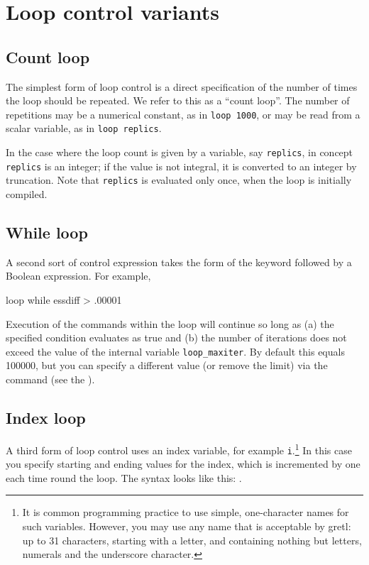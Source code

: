 \section{Loop control variants}
\label{loop-control}

\subsection{Count loop}
\label{loop-count}

The simplest form of loop control is a direct specification of the
number of times the loop should be repeated.  We refer to this as a
``count loop''.  The number of repetitions may be a numerical
constant, as in \verb+loop 1000+, or may be read from a scalar
variable, as in \verb+loop replics+.

In the case where the loop count is given by a variable, say
\verb+replics+, in concept \verb+replics+ is an integer; if the value
is not integral, it is converted to an integer by truncation.  Note
that \verb+replics+ is evaluated only once, when the loop is initially
compiled.
      

\subsection{While loop}
\label{loop-while}

A second sort of control expression takes the form of the keyword
 followed by a Boolean expression.  For example,
%
\begin{code}
loop while essdiff > .00001
\end{code}

Execution of the commands within the loop will continue so long as (a)
the specified condition evaluates as true and (b) the number of
iterations does not exceed the value of the internal variable
\verb|loop_maxiter|.  By default this equals 100000, but you can specify
a different value (or remove the limit) via the  command (see 
the \GCR).

\subsection{Index loop}
\label{loop-index}

A third form of loop control uses an index variable, for example
\verb+i+.\footnote{It is common programming practice to use simple,
  one-character names for such variables.  However, you may use any
  name that is acceptable by gretl: up to 31 characters, starting with
  a letter, and containing nothing but letters, numerals and the
  underscore character.}  In this case you specify starting and ending
values for the index, which is incremented by one each time round the
loop.  The syntax looks like this: .

